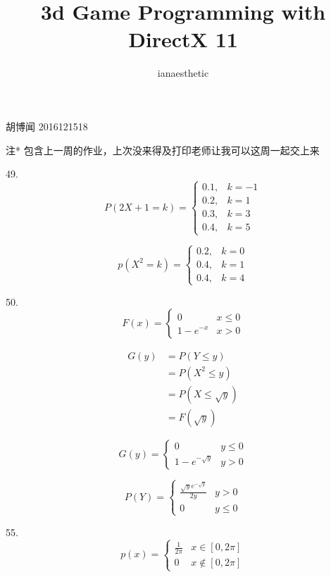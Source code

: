 \documentclass[10pt, a4paper,twocolumn]{article}
\author{ianaesthetic}
\title{3d Game Programming with DirectX 11}
\begin{document}
    胡博闻 2016121518 

    注* 包含上一周的作业，上次没来得及打印老师让我可以这周一起交上来
    \medskip 

    49. 
    $$
        P(2X + 1 = k) = 
        \begin{cases}
            0.1, & k = -1 \\
            0.2, & k = 1 \\
            0.3, & k = 3 \\
            0.4, & k = 5
        \end{cases}
    $$

    $$
        p(X^2 = k) = 
        \begin{cases}
            0.2, & k = 0 \\ 
            0.4, & k = 1 \\
            0.4, & k = 4 
        \end{cases}
    $$

    50.
    $$F(x) = 
        \begin{cases}
            0 & x \leqslant 0 \\
        1 - e^{-x}  & x > 0
        \end{cases}
    $$

    $$
        \begin{aligned}
            G(y)
            &= P(Y \leqslant y) \\
            &= P(X^2 \leqslant y) \\
            &= P(X \leqslant \sqrt{y}) \\
            &= F(\sqrt{y})  
        \end{aligned}
    $$

    $$
        G(y) = 
        \begin{cases}
            0 & y \leqslant 0 \\ 
            1 - e^{-\sqrt{y}} & y > 0 
        \end{cases}
    $$

    $$
        P(Y) = 
        \begin{cases}
            \frac{\sqrt{y}e^{-\sqrt{y}}}{2y} & y >  0 \\
            0 & y \leqslant 0 
        \end{cases}
    $$

    55. 
    $$
        p(x) = 
        \begin{cases}
            \frac{1}{2\pi} & x \in [0, 2\pi] \\
            0 & x \notin  [0, 2\pi]
        \end{cases}
    $$
\end{document}
